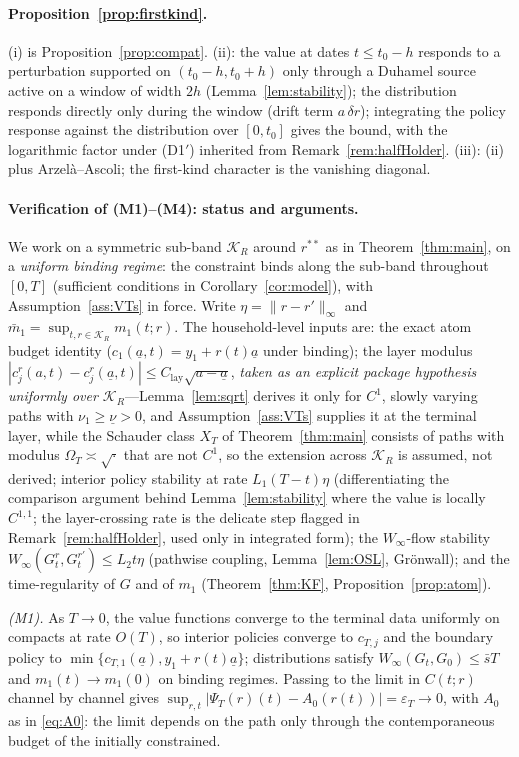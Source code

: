 \documentclass[11pt]{article}
\theoremstyle{definition}
\theoremstyle{remark}
\newcommand{\ubar}[1]{\underline{#1}}
\newcommand{\Kcal}{\mathcal{K}}
\newcommand{\uba}{\ubar{a}}
\newcommand{\psit}{\Psi_T}
\begin{document}
\paragraph{Proposition~\ref{prop:firstkind}.} (i) is
Proposition~\ref{prop:compat}. (ii): the value at dates $t\le t_0-h$
responds to a perturbation supported on $(t_0-h,t_0+h)$ only through a
Duhamel source active on a window of width $2h$
(Lemma~\ref{lem:stability}); the distribution responds directly only
during the window (drift term $a\,\delta r$); integrating the policy
response against the distribution over $[0,t_0]$ gives the bound,
with the logarithmic factor under (D1$'$) inherited from
Remark~\ref{rem:halfHolder}. (iii): (ii) plus Arzel\`a--Ascoli; the
first-kind character is the vanishing diagonal.

\paragraph{Verification of (M1)--(M4): status and arguments.}
We work on a symmetric sub-band $\Kcal_R$ around $r^{**}$ as in
Theorem~\ref{thm:main}, on a \emph{uniform binding regime}: the
constraint binds along the sub-band throughout $[0,T]$ (sufficient
conditions in Corollary~\ref{cor:model}), with
Assumption~\ref{ass:VTs} in force. Write
$\eta=\|r-r'\|_\infty$ and $\bar m_1=\sup_{t,r\in\Kcal_R}m_1(t;r)$.
The household-level inputs are: the exact atom budget identity
($c_1(\uba,t)=y_1+r(t)\uba$ under binding); the layer modulus
$|c^r_j(a,t)-c^r_j(\uba,t)|\le C_{\mathrm{lay}}\sqrt{a-\uba}$,
\emph{taken as an explicit package hypothesis uniformly over
$\Kcal_R$}---Lemma~\ref{lem:sqrt} derives it only for $C^1$, slowly
varying paths with $\nu_1\ge\ubar\nu>0$, and
Assumption~\ref{ass:VTs} supplies it at the terminal layer, while the
Schauder class $X_T$ of Theorem~\ref{thm:main} consists of paths with
modulus $\Omega_T\asymp\sqrt{\cdot}$ that are not $C^1$, so the
extension across $\Kcal_R$ is assumed, not derived; interior policy
stability at rate
$L_1(T-t)\eta$ (differentiating the comparison argument behind
Lemma~\ref{lem:stability} where the value is locally $C^{1,1}$; the
layer-crossing rate is the delicate step flagged in
Remark~\ref{rem:halfHolder}, used only in integrated form); the
$W_\infty$-flow stability $W_\infty(G^r_t,G^{r'}_t)\le L_2t\eta$
(pathwise coupling, Lemma~\ref{lem:OSL}, Gr\"onwall); and the
time-regularity of $G$ and of $m_1$ (Theorem~\ref{thm:KF},
Proposition~\ref{prop:atom}).

\emph{(M1).} As $T\to0$, the value functions converge to the terminal
data uniformly on compacts at rate $O(T)$, so interior policies
converge to $c_{T,j}$ and the boundary policy to
$\min\{c_{T,1}(\uba),y_1+r(t)\uba\}$; distributions satisfy
$W_\infty(G_t,G_0)\le\bar sT$ and $m_1(t)\to m_1(0)$ on binding
regimes. Passing to the limit in $C(t;r)$ channel by channel gives
$\sup_{r,t}|\psit(r)(t)-A_0(r(t))|=\varepsilon_T\to0$, with
$A_0$ as in \eqref{eq:A0}: the limit depends on the path only through
the contemporaneous budget of the initially constrained.
\end{document}
